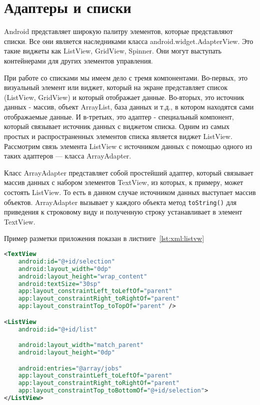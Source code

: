 \section{Адаптеры и списки}
Android представляет широкую палитру элементов, которые представляют
списки. Все они является наследниками класса android.widget.AdapterView.
Это такие виджеты как ListView, GridView, Spinner. Они могут выступать
контейнерами для других элементов управления.\par
При работе со списками мы имеем дело с тремя компонентами. Во-первых,
это визуальный элемент или виджет, который на экране представляет список
(ListView, GridView) и который отображает данные. Во-вторых, это источник
данных - массив, объект ArrayList, база данных и т.д., в котором находятся
сами отображаемые данные. И в-третьих, это адаптер - специальный
компонент, который связывает источник данных с виджетом списка.
Одним из самых простых и распространенных элементов списка является
виджет ListView. Рассмотрим связь элемента ListView с источником данных
с помощью одного из таких адаптеров --- класса ArrayAdapter.\par
Класс ArrayAdapter представляет собой простейший адаптер, который
связывает массив данных с набором элементов TextView, из которых, к
примеру, может состоять ListView. То есть в данном случае источником
данных выступает массив объектов. ArrayAdapter вызывает у каждого
объекта метод \texttt{toString()} для приведения к строковому виду
и полученную строку устанавливает в элемент TextView.\par
Пример разметки приложения показан в листниге~\ref{lst:xml:listvw}

\begin{lstlisting}[language=XML
	, label=lst:xml:listvw
	]
<TextView
	android:id="@+id/selection"
	android:layout_width="0dp"
	android:layout_height="wrap_content"
	android:textSize="30sp"
	app:layout_constraintLeft_toLeftOf="parent"
	app:layout_constraintRight_toRightOf="parent"
	app:layout_constraintTop_toTopOf="parent" />

<ListView
	android:id="@+id/list"

	android:layout_width="match_parent"
	android:layout_height="0dp"

	android:entries="@array/jobs"
	app:layout_constraintLeft_toLeftOf="parent"
	app:layout_constraintRight_toRightOf="parent"
	app:layout_constraintTop_toBottomOf="@+id/selection">
</ListView>
\end{lstlisting}

